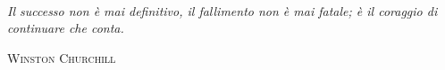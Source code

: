 \cleardoublepage
\thispagestyle{empty}
\vspace*{3cm}
\begin{flushright}
    \\[5pt]
    \begin{minipage}{.5\textwidth}
        { \slshape
            Il successo non è mai definitivo, il fallimento non è mai
            fatale; è il coraggio di continuare che conta.
        }
    \end{minipage}
\end{flushright}
\begin{flushright}
    \textsc{Winston Churchill} \\[15pt]
\end{flushright}
\vspace{2cm}
\begin{flushright}
\end{flushright}
\cleardoublepage

